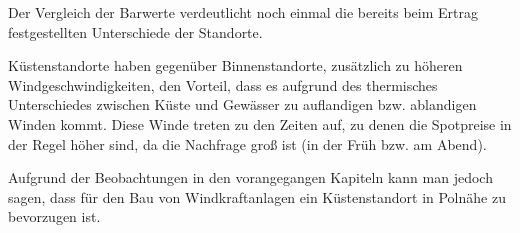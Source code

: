 \documentclass[a4paper,12pt]{article}
\begin{document}
	\noindent Der Vergleich der Barwerte verdeutlicht noch einmal die bereits beim Ertrag festgestellten Unterschiede der Standorte.\\ \par
	\noindent Küstenstandorte haben gegenüber Binnenstandorte, zusätzlich zu höheren Windgeschwindigkeiten, den Vorteil, dass es aufgrund des thermisches Unterschiedes zwischen Küste und Gewässer zu auflandigen bzw. ablandigen Winden kommt. Diese Winde treten zu den Zeiten auf, zu denen die Spotpreise in der Regel höher sind, da die Nachfrage groß ist (in der Früh bzw. am Abend).\\ \par
	\noindent Aufgrund der Beobachtungen in den vorangegangen Kapiteln kann man jedoch sagen, dass für den Bau von Windkraftanlagen ein Küstenstandort in Polnähe zu bevorzugen ist.
	\newpage
	\listoffigures
	
\end{document}
